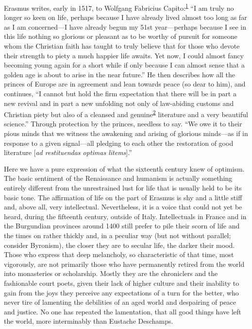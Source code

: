 Erasmus writes, early in 1517, to Wolfgang Fabricius
Capito:\textsuperscript{\protect\hypertarget{09_Chapter_Two__THE_CRAVING_FOR_A_M.xhtmlux5cux23id_2084}{\protect\hyperlink{23_NOTES.xhtmlux5cux23id_2085}{1}}}
``I am truly no longer so keen on life, perhaps because I have already
lived almost too long as far as I am concerned---I have already begun my
51st year---perhaps because I see in this life nothing so glorious or
pleasant as to be worthy of pursuit for someone whom the Christian faith
has taught to truly believe that for those who devote their strength to
piety a much happier life awaits. Yet now, I could almost fancy becoming
young again for a short while if only because I can almost sense that a
golden age is about to arise in the near future.'' He then describes how
all the princes of Europe are in agreement and lean towards peace (so
dear to him), and continues, ``I cannot but hold the firm expectation
that there will be in part a new revival and in part a new unfolding not
only of law-abiding customs and Christian piety but also of a cleansed
and
genuine\textsuperscript{\protect\hypertarget{09_Chapter_Two__THE_CRAVING_FOR_A_M.xhtmlux5cux23id_2082}{\protect\hyperlink{23_NOTES.xhtmlux5cux23id_2083}{2}}}
literature and a very beautiful science.'' Through protection by the
princes, needless to say. ``We owe it to their pious minds that we
witness the awakening and arising of glorious minds---as if in response
to a given signal---all pledging to each other the restoration of good
literature {[}\emph{ad restituendas optimas litems}{]}.''

\protect\hypertarget{09_Chapter_Two__THE_CRAVING_FOR_A_M.xhtmlux5cux23page_32}{}{}Here
we have a pure expression of what the sixteenth century knew of
optimism. The basic sentiment of the Renaissance and humanism is
actually something entirely different from the unrestrained lust for
life that is usually held to be its basic tone. The affirmation of life
on the part of Erasmus is shy and a little stiff and, above all, very
intellectual. Nevertheless, it is a voice that could not yet be heard,
during the fifteenth century, outside of Italy. Intellectuals in France
and in the Burgundian provinces around 1400 still prefer to pile their
scorn of life and the times on rather thickly and, in a peculiar way
(but not without parallel; consider Byronism), the closer they are to
secular life, the darker their mood. Those who express that deep
melancholy, so characteristic of that time, most vigorously, are not
primarily those who have permanently retired from the world into
monasteries or scholarship. Mostly they are the chroniclers and the
fashionable court poets, given their lack of higher culture and their
inability to gain from the joys they perceive any expectations of a turn
for the better, who never tire of lamenting the debilities of an aged
world and despairing of peace and justice. No one has repeated the
lamentation, that all good things have left the world, more interminably
than Eustache Deschamps.

